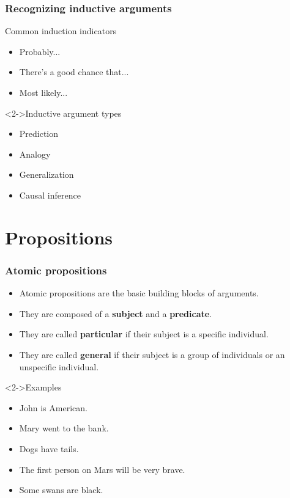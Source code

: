 \documentclass[10pt,letterpaper,xcolor=dvipsnames,handout]{beamer}
\begin{document}
\begin{frame}
\frametitle{Recognizing inductive arguments}

\begin{block}{Common induction indicators}
\begin{itemize}
  \item Probably...
  \item There's a good chance that...
  \item Most likely...
\end{itemize}

\end{block}

\begin{block}<2->{Inductive argument types}
\begin{itemize}
  \item Prediction
  \item Analogy
  \item Generalization
  \item Causal inference
\end{itemize}
\end{block}

\end{frame}

\section{Propositions}

\begin{frame}
\frametitle{Atomic propositions}

\begin{itemize}
  \item Atomic propositions are the basic building blocks of arguments.
  \item They are composed of a \textbf{subject} and a \textbf{predicate}.
  \item They are called \textbf{particular} if their subject is a specific individual.
  \item They are called \textbf{general} if their subject is a group of individuals or an unspecific individual.
\end{itemize}

\begin{block}<2->{Examples}
\begin{itemize}
  \item John is American. 
  \item Mary went to the bank. 
  \item Dogs have tails. 
  \item The first person on Mars will be very brave. 
  \item Some swans are black. 
\end{itemize}
\end{block}

\end{frame}
\end{document}
